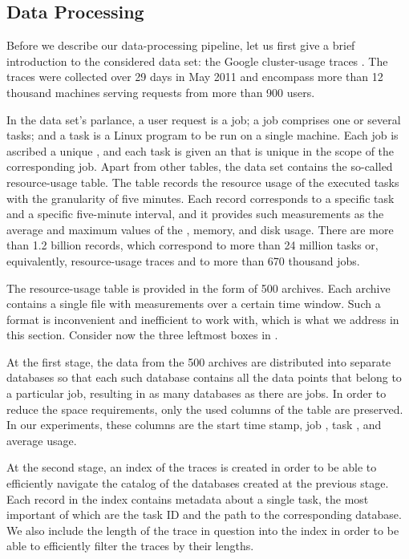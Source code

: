 \subsection{Data Processing}

Before we describe our data-processing pipeline, let us first give a brief
introduction to the considered data set: the Google cluster-usage traces
\cite{reiss2011}. The traces were collected over 29 days in May 2011 and
encompass more than 12 thousand machines serving requests from more than 900
users.

In the data set's parlance, a user request is a job; a job comprises one or
several tasks; and a task is a Linux program to be run on a single machine.
Each job is ascribed a unique , and each task is given an  that is
unique in the scope of the corresponding job. Apart from other tables, the data
set contains the so-called resource-usage table. The table records the resource
usage of the executed tasks with the granularity of five minutes. Each record
corresponds to a specific task and a specific five-minute interval, and it
provides such measurements as the average and maximum values of the ,
memory, and disk usage. There are more than 1.2 billion records, which
correspond to more than 24 million tasks or, equivalently, resource-usage traces
and to more than 670 thousand jobs.

The resource-usage table is provided in the form of 500 archives. Each archive
contains a single file with measurements over a certain time window. Such a
format is inconvenient and inefficient to work with, which is what we address in
this section. Consider now the three leftmost boxes in .

At the first stage, the data from the 500 archives are distributed into separate
databases so that each such database contains all the data points that belong to
a particular job, resulting in as many databases as there are jobs. In order to
reduce the space requirements, only the used columns of the table are preserved.
In our experiments, these columns are the start time stamp, job , task
, and average  usage.

At the second stage, an index of the traces is created in order to be able to
efficiently navigate the catalog of the databases created at the previous stage.
Each record in the index contains metadata about a single task, the most
important of which are the task ID and the path to the corresponding database.
We also include the length of the trace in question into the index in order to
be able to efficiently filter the traces by their lengths.

